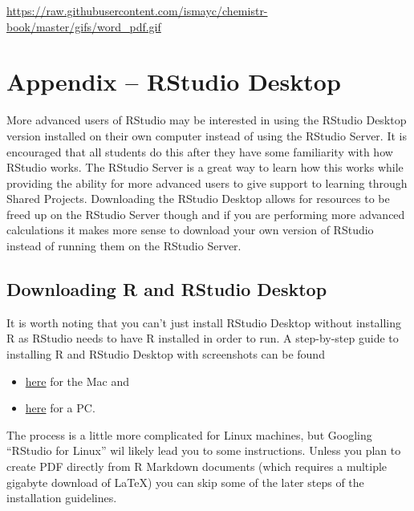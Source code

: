 \documentclass[]{tufte-book}
\providecommand{\tightlist}{%
  \setlength{\itemsep}{0pt}\setlength{\parskip}{0pt}}
\begin{document}
\vspace{0.1in}

\begin{center}\footnotesize{\url{https://raw.githubusercontent.com/ismayc/chemistr-book/master/gifs/word_pdf.gif}}\end{center}

\vspace{0.1in}

\appendix


\chapter{Appendix -- RStudio Desktop}\label{appendix-rstudio-desktop}

More advanced users of RStudio may be interested in using the RStudio
Desktop version installed on their own computer instead of using the
RStudio Server. It is encouraged that all students do this after they
have some familiarity with how RStudio works. The RStudio Server is a
great way to learn how this works while providing the ability for more
advanced users to give support to learning through Shared Projects.
Downloading the RStudio Desktop allows for resources to be freed up on
the RStudio Server though and if you are performing more advanced
calculations it makes more sense to download your own version of RStudio
instead of running them on the RStudio Server.

\section{Downloading R and RStudio
Desktop}\label{downloading-r-and-rstudio-desktop}

It is worth noting that you can't just install RStudio Desktop without
installing R as RStudio needs to have R installed in order to run. A
step-by-step guide to installing R and RStudio Desktop with screenshots
can be found

\begin{itemize}
\tightlist
\item
  \href{http://www.reed.edu/data-at-reed/software/R/r_studio.html}{here}
  for the Mac and
\item
  \href{http://www.reed.edu/data-at-reed/software/R/r_studio_pc.html}{here}
  for a PC.
\end{itemize}

The process is a little more complicated for Linux machines, but
Googling ``RStudio for Linux'' wil likely lead you to some instructions.
Unless you plan to create PDF directly from R Markdown documents (which
requires a multiple gigabyte download of LaTeX) you can skip some of the
later steps of the installation guidelines.
\end{document}
